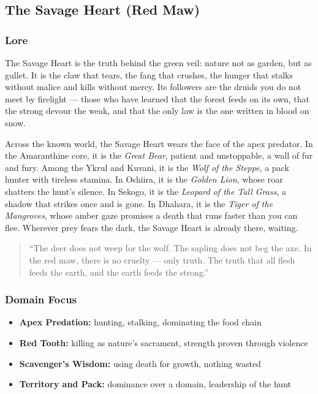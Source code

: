 
\subsection{The Savage Heart (Red Maw)}

\subsubsection*{Lore}
The Savage Heart is the truth behind the green veil: nature not as garden, but as gullet. It is the claw that tears, the fang that crushes, the hunger that stalks without malice and kills without mercy. Its followers are the druids you do not meet by firelight --- those who have learned that the forest feeds on its own, that the strong devour the weak, and that the only law is the one written in blood on snow.

Across the known world, the Savage Heart wears the face of the apex predator. In the Amaranthine core, it is the \textit{Great Bear}, patient and unstoppable, a wall of fur and fury. Among the Ykrul and Kuvani, it is the \textit{Wolf of the Steppe}, a pack hunter with tireless stamina. In Oshiira, it is the \textit{Golden Lion}, whose roar shatters the hunt's silence. In Sekogo, it is the \textit{Leopard of the Tall Grass}, a shadow that strikes once and is gone. In Dhahara, it is the \textit{Tiger of the Mangroves}, whose amber gaze promises a death that runs faster than you can flee. Wherever prey fears the dark, the Savage Heart is already there, waiting.

\begin{quote}
``The deer does not weep for the wolf. The sapling does not beg the axe. In the red maw, there is no cruelty --- only truth. The truth that all flesh feeds the earth, and the earth feeds the strong.''
\end{quote}

\subsubsection*{Domain Focus}
\begin{itemize}
  \item \textbf{Apex Predation:} hunting, stalking, dominating the food chain
  \item \textbf{Red Tooth:} killing as nature's sacrament, strength proven through violence
  \item \textbf{Scavenger's Wisdom:} using death for growth, nothing wasted
  \item \textbf{Territory and Pack:} dominance over a domain, leadership of the hunt
\end{itemize}

